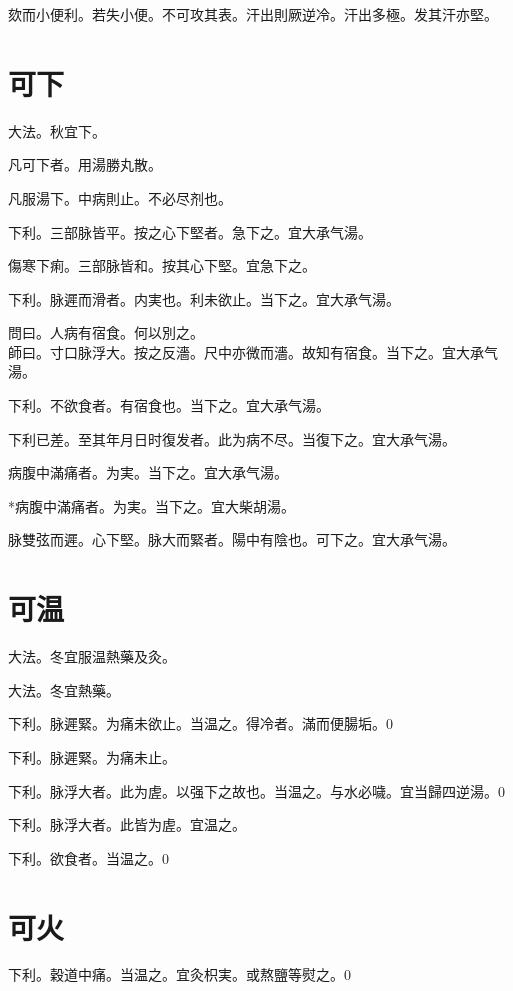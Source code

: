 欬而小便利。若失小便。不可攻其表。汗出則厥逆冷。汗出多極。发其汗亦堅。{\maijing}

\section{可下}

大法。秋宜下。

凡可下者。用湯勝丸散。

凡服湯下。中病則止。不必尽剂也。

下利。三部脉皆平。按之心下堅者。急下之。宜{\khaaitp 大}承气湯。

傷寒下痢。三部脉皆和。按其心下堅。宜急下之。{\gaoben}

下利。脉遲而滑者。{\khaaitp 内}実也。利未欲止。当下之。宜{\khaaitp 大}承气湯。

問曰。人病有宿食。何以別之。\\
師曰。寸口脉浮大。按之反濇。尺中亦微而濇。故知有宿食。当下之。宜{\khaaitp 大}承气湯。

下利。不欲食者。有宿食也。当下之。宜{\khaaitp 大}承气湯。

下利{\khaaitp 已}差。至其{\khaaitp 年月日}时復发者。此为病不尽。当復下之。宜{\khaaitp 大}承气湯。

病腹中滿痛者。为実。当下之。宜大承气湯。

*病腹中滿痛者。为実。当下之。宜大柴胡湯。

脉雙弦而遲。心下堅。脉大而緊者。陽中有陰也。可下之。宜{\khaaitp 大}承气湯。

\section{可温}

大法。冬宜服温熱藥及灸。

大法。冬宜熱藥。{\gaoben}

下利。脉遲緊。为痛未欲止。当温之。得冷者。滿而便腸垢。0

下利。脉遲緊。为痛未止。{\gaoben}

下利。脉浮大者。此为虗。以强下之故也。当温之。与水必噦。{\khaaitp 宜当歸四逆湯。}0

下利。脉浮大者。此皆为虗。宜温之。{\gaoben}

下利。欲食者。当温之。0

\section{可火}

下利。穀道中痛。当温之。宜灸枳実。或熬鹽等熨之。0

